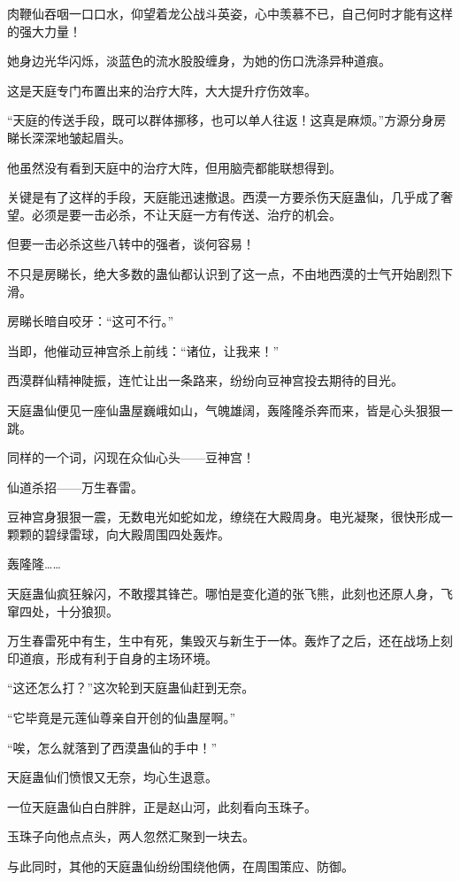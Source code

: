 \begin{this_body}
肉鞭仙吞咽一口口水，仰望着龙公战斗英姿，心中羡慕不已，自己何时才能有这样的强大力量！

她身边光华闪烁，淡蓝色的流水股股缠身，为她的伤口洗涤异种道痕。

这是天庭专门布置出来的治疗大阵，大大提升疗伤效率。

“天庭的传送手段，既可以群体挪移，也可以单人往返！这真是麻烦。”方源分身房睇长深深地皱起眉头。

他虽然没有看到天庭中的治疗大阵，但用脑壳都能联想得到。

关键是有了这样的手段，天庭能迅速撤退。西漠一方要杀伤天庭蛊仙，几乎成了奢望。必须是要一击必杀，不让天庭一方有传送、治疗的机会。

但要一击必杀这些八转中的强者，谈何容易！

不只是房睇长，绝大多数的蛊仙都认识到了这一点，不由地西漠的士气开始剧烈下滑。

房睇长暗自咬牙：“这可不行。”

当即，他催动豆神宫杀上前线：“诸位，让我来！”

西漠群仙精神陡振，连忙让出一条路来，纷纷向豆神宫投去期待的目光。

天庭蛊仙便见一座仙蛊屋巍峨如山，气魄雄阔，轰隆隆杀奔而来，皆是心头狠狠一跳。

同样的一个词，闪现在众仙心头——豆神宫！

仙道杀招——万生春雷。

豆神宫身狠狠一震，无数电光如蛇如龙，缭绕在大殿周身。电光凝聚，很快形成一颗颗的碧绿雷球，向大殿周围四处轰炸。

轰隆隆……

天庭蛊仙疯狂躲闪，不敢撄其锋芒。哪怕是变化道的张飞熊，此刻也还原人身，飞窜四处，十分狼狈。

万生春雷死中有生，生中有死，集毁灭与新生于一体。轰炸了之后，还在战场上刻印道痕，形成有利于自身的主场环境。

“这还怎么打？”这次轮到天庭蛊仙赶到无奈。

“它毕竟是元莲仙尊亲自开创的仙蛊屋啊。”

“唉，怎么就落到了西漠蛊仙的手中！”

天庭蛊仙们愤恨又无奈，均心生退意。

一位天庭蛊仙白白胖胖，正是赵山河，此刻看向玉珠子。

玉珠子向他点点头，两人忽然汇聚到一块去。

与此同时，其他的天庭蛊仙纷纷围绕他俩，在周围策应、防御。


\end{this_body}
